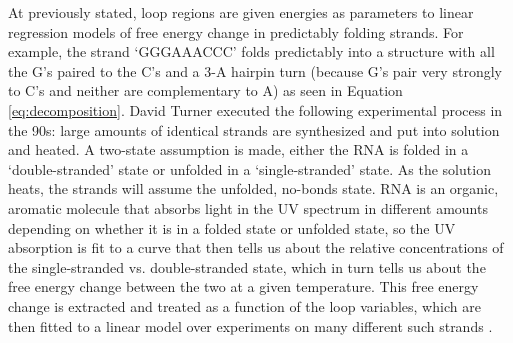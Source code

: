 At previously stated, loop regions are given energies as parameters to
linear regression models of free energy change in predictably folding
strands. For example, the strand `GGGAAACCC' folds predictably into a
structure with all the G's paired to the C's and a 3-A hairpin turn
(because G's pair very strongly to C's and neither are complementary
to A) as seen in Equation \ref{eq:decomposition}. David Turner
executed the following experimental process in the 90s: large amounts
of identical strands are synthesized and put into solution and
heated. A two-state assumption is made, either the RNA is folded in a
`double-stranded' state or unfolded in a `single-stranded' state. As
the solution heats, the strands will assume the unfolded, no-bonds
state. RNA is an organic, aromatic molecule that absorbs light in the
UV spectrum in different amounts depending on whether it is in a
folded state or unfolded state, so the UV absorption is fit to a curve
that then tells us about the relative concentrations of the
single-stranded vs. double-stranded state, which in turn tells us
about the free energy change between the two at a given
temperature. This free energy change is extracted and treated as a
function of the loop variables, which are then fitted to a linear
model over experiments on many different such strands
\cite{xia1998thermodynamic}.

